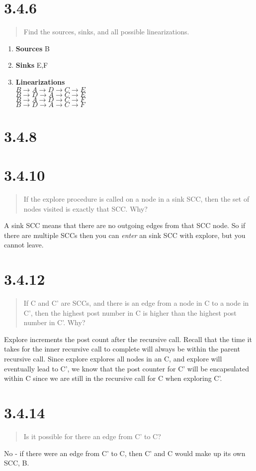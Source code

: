 \documentclass[12pt, letterpaper, twoside]{article}
\begin{document}
\section*{3.4.6}
\begin{quote}
  Find the sources, sinks, and all possible linearizations.
\end{quote}
\begin{enumerate}
  \item \textbf{Sources}
  B
  \item \textbf{Sinks}
  E,F
  \item \textbf{Linearizations}
  \\
  $B\rightarrow{A}\rightarrow{D}\rightarrow{C}\rightarrow{E}$
  \\
  $B\rightarrow{D}\rightarrow{A}\rightarrow{C}\rightarrow{E}$
  \\
  $B\rightarrow{A}\rightarrow{D}\rightarrow{C}\rightarrow{F}$
  \\
  $B\rightarrow{D}\rightarrow{A}\rightarrow{C}\rightarrow{F}$
\end{enumerate}

\section*{3.4.8}

\section*{3.4.10}
\begin{quote}
  If the explore procedure is called on a node in a sink SCC, then the set of nodes visited is exactly that SCC.
  Why?
\end{quote}

A sink SCC means that there are no outgoing edges from that SCC node. So if there are multiple SCCs 
then you can \emph{enter} an sink SCC with explore, but you cannot leave.

\section*{3.4.12}
\begin{quote}
  If C and C' are SCCs, and there is an edge from a node in C to a node in C', then the highest post number in C is higher than the highest post number in C'. Why?
\end{quote}

Explore increments the post count after the recursive call. Recall that the time it takes for the inner recursive call to complete will always be within the parent recursive call. 
Since explore explores all nodes in an C, and explore will eventually lead to C', we know that the post counter for C' will be encapsulated within C since we are still 
in the recursive call for C when exploring C'.

\section*{3.4.14}
\begin{quote}
  Is it possible for there an edge from C' to C?
\end{quote}

No - if there were an edge from C' to C, then C' and C would make up its own SCC, B.
\end{document}
